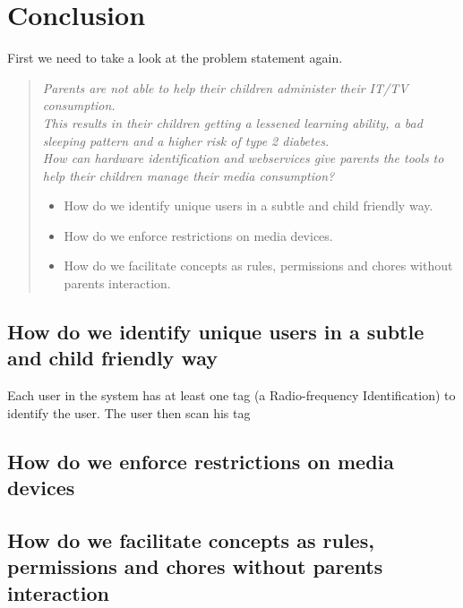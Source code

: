 \chapter{Conclusion}


First we need to take a look at the problem statement again.
\begin{verse}
\textit{Parents are not able to help their children administer their IT/TV consumption.\\
This results in their children getting a lessened learning ability, a bad sleeping pattern and a higher risk of type 2 diabetes.\\
How can hardware identification and webservices give parents the tools to help their children manage their media consumption?}
	\begin{itemize}
		\item How do we identify unique users in a subtle and child friendly way.
		\item How do we enforce restrictions on media devices.
		\item How do we facilitate concepts as rules, permissions and chores without parents interaction.
	\end{itemize}
\end{verse}

\section{How do we identify unique users in a subtle and child friendly way}
Each user in the system has at least one tag (a Radio-frequency Identification) to identify the user. The user then scan his tag  

\section{How do we enforce restrictions on media devices}


\section{How do we facilitate concepts as rules, permissions and chores without parents interaction}